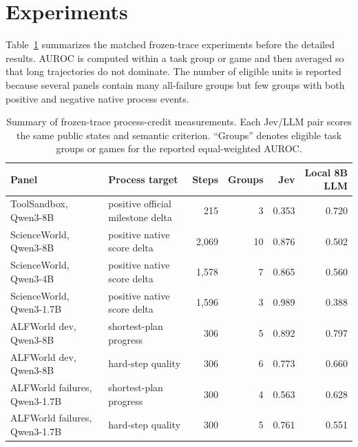 \documentclass{article}
\begin{document}
\section{Experiments}

Table~\ref{tab:frozen-summary} summarizes the matched frozen-trace experiments before the detailed results. AUROC is computed within a task group or game and then averaged so that long trajectories do not dominate. The number of eligible units is reported because several panels contain many all-failure groups but few groups with both positive and negative native process events.

\begin{table}[t]
\caption{Summary of frozen-trace process-credit measurements. Each Jev/LLM pair scores the same public states and semantic criterion. ``Groups'' denotes eligible task groups or games for the reported equal-weighted AUROC.}
\label{tab:frozen-summary}
\centering
\small
\begin{tabular}{llrrrr}
\toprule
Panel & Process target & Steps & Groups & Jev & Local 8B LLM \\
\midrule
ToolSandbox, Qwen3-8B & positive official milestone delta & 215 & 3 & 0.353 & 0.720 \\
ScienceWorld, Qwen3-8B & positive native score delta & 2,069 & 10 & 0.876 & 0.502 \\
ScienceWorld, Qwen3-4B & positive native score delta & 1,578 & 7 & 0.865 & 0.560 \\
ScienceWorld, Qwen3-1.7B & positive native score delta & 1,596 & 3 & 0.989 & 0.388 \\
ALFWorld dev, Qwen3-8B & shortest-plan progress & 306 & 5 & 0.892 & 0.797 \\
ALFWorld dev, Qwen3-8B & hard-step quality & 306 & 6 & 0.773 & 0.660 \\
ALFWorld failures, Qwen3-1.7B & shortest-plan progress & 300 & 4 & 0.563 & 0.628 \\
ALFWorld failures, Qwen3-1.7B & hard-step quality & 300 & 5 & 0.761 & 0.551 \\
\bottomrule
\end{tabular}
\end{table}
\end{document}
